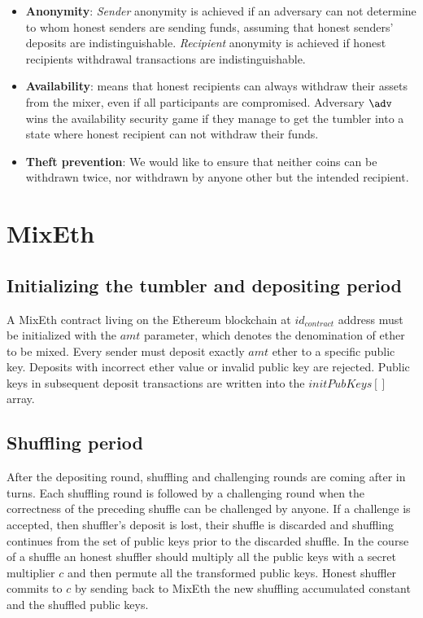 \documentclass[a4paper]{article}
\theoremstyle{definition}
\begin{document}
\begin{itemize}
	\item \textbf{Anonymity}: \textit{Sender} anonymity is achieved if an adversary can not determine to whom honest senders are sending funds, assuming that honest senders' deposits are indistinguishable. \textit{Recipient} anonymity is achieved if honest recipients withdrawal transactions are indistinguishable. 
	\item \textbf{Availability}: means that honest recipients can always withdraw their assets from the mixer, even if all participants are compromised. Adversary $\adv$ wins the availability security game if they manage to get the tumbler into a state where honest recipient can not withdraw their funds.
	\item \textbf{Theft prevention}: We would like to ensure that neither coins can be withdrawn twice, nor withdrawn by anyone other but the intended recipient.
\end{itemize}
\section{MixEth}
\subsection{Initializing the tumbler and depositing period}

A MixEth contract living on the Ethereum blockchain at $id_{contract}$ address must be initialized with the $amt$ parameter, which denotes the denomination of ether to be mixed.
Every sender must deposit exactly $amt$ ether to a specific public key. Deposits with incorrect ether value or invalid public key are rejected. Public keys in subsequent deposit transactions are written into the $initPubKeys[]$ array.   

\subsection{Shuffling period}
After the depositing round, shuffling and challenging rounds are coming after in turns. Each shuffling round is followed by a challenging round when the correctness of the preceding shuffle can be challenged by anyone. If a challenge is accepted, then shuffler's deposit is lost, their shuffle is discarded and shuffling continues from the set of public keys prior to the discarded shuffle. In the course of a shuffle an honest shuffler should multiply all the public keys with a secret multiplier $c$ and then permute all the transformed public keys. Honest shuffler commits to $c$ by sending back to MixEth the new shuffling accumulated constant and the shuffled public keys.
\end{document}
